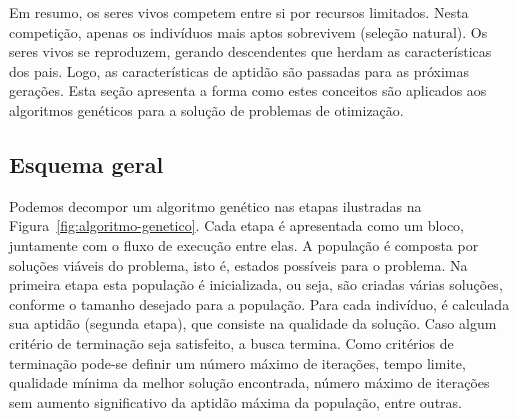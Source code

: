 Em resumo, os seres vivos competem entre si por recursos limitados. Nesta competição, apenas os indivíduos mais aptos sobrevivem (seleção natural). Os seres vivos se reproduzem, gerando descendentes que herdam as características dos pais. Logo, as características de aptidão são passadas para as próximas gerações. Esta seção apresenta a forma como estes conceitos são aplicados aos algoritmos genéticos para a solução de problemas de otimização.

\subsection{Esquema geral}

Podemos decompor um algoritmo genético nas etapas ilustradas na Figura~\ref{fig:algoritmo-genetico}. Cada etapa é apresentada como um bloco, juntamente com o fluxo de execução entre elas. A população é composta por soluções viáveis do problema, isto é, estados possíveis para o problema. Na primeira etapa esta população é inicializada, ou seja, são criadas várias soluções, conforme o tamanho desejado para a população. Para cada indivíduo, é calculada sua aptidão (segunda etapa), que consiste na qualidade da solução. Caso algum critério de terminação seja satisfeito, a busca termina. Como critérios de terminação pode-se definir um número máximo de iterações, tempo limite, qualidade mínima da melhor solução encontrada, número máximo de iterações sem aumento significativo da aptidão máxima da população, entre outras.

